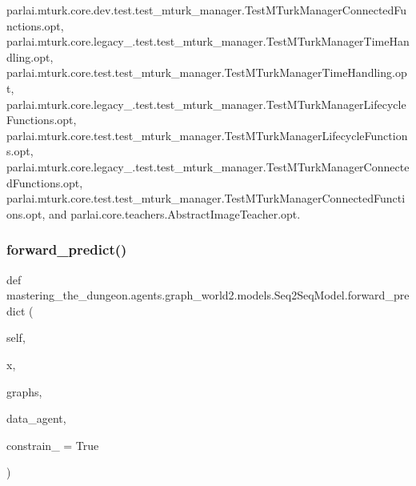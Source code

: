 parlai.\+mturk.\+core.\+dev.\+test.\+test\+\_\+mturk\+\_\+manager.\+Test\+M\+Turk\+Manager\+Connected\+Functions.\+opt, parlai.\+mturk.\+core.\+legacy\+\_.\+test.\+test\+\_\+mturk\+\_\+manager.\+Test\+M\+Turk\+Manager\+Time\+Handling.\+opt, parlai.\+mturk.\+core.\+test.\+test\+\_\+mturk\+\_\+manager.\+Test\+M\+Turk\+Manager\+Time\+Handling.\+opt, parlai.\+mturk.\+core.\+legacy\+\_.\+test.\+test\+\_\+mturk\+\_\+manager.\+Test\+M\+Turk\+Manager\+Lifecycle\+Functions.\+opt, parlai.\+mturk.\+core.\+test.\+test\+\_\+mturk\+\_\+manager.\+Test\+M\+Turk\+Manager\+Lifecycle\+Functions.\+opt, parlai.\+mturk.\+core.\+legacy\+\_.\+test.\+test\+\_\+mturk\+\_\+manager.\+Test\+M\+Turk\+Manager\+Connected\+Functions.\+opt, parlai.\+mturk.\+core.\+test.\+test\+\_\+mturk\+\_\+manager.\+Test\+M\+Turk\+Manager\+Connected\+Functions.\+opt, and parlai.\+core.\+teachers.\+Abstract\+Image\+Teacher.\+opt.

\mbox{\label{classmastering__the__dungeon_1_1agents_1_1graph__world2_1_1models_1_1Seq2SeqModel_ac3ede43d27b6708c3568ed1d1c8a8944}} 
\subsubsection{\texorpdfstring{forward\+\_\+predict()}{forward\_predict()}}
{\footnotesize\ttfamily def mastering\+\_\+the\+\_\+dungeon.\+agents.\+graph\+\_\+world2.\+models.\+Seq2\+Seq\+Model.\+forward\+\_\+predict (\begin{DoxyParamCaption}\item[{}]{self,  }\item[{}]{x,  }\item[{}]{graphs,  }\item[{}]{data\+\_\+agent,  }\item[{}]{constrain\+\_\+ = {\ttfamily True} }\end{DoxyParamCaption})}



